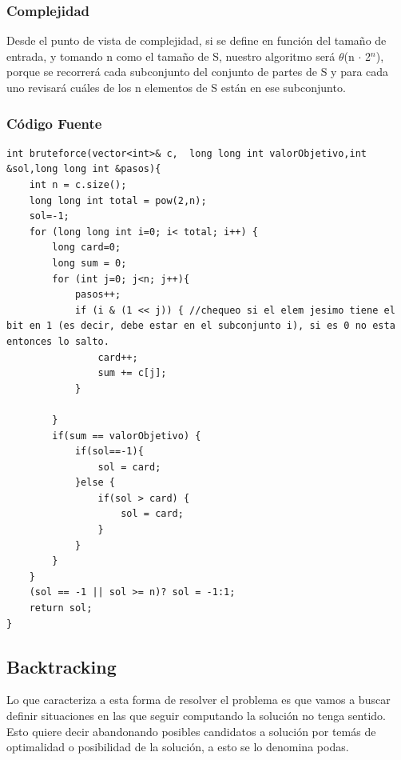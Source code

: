 \documentclass[7pt,a4paper]{article}
\begin{document}
\subsubsection{Complejidad}
Desde el punto de vista de complejidad, si se define en función del tamaño de entrada, y tomando n como el tamaño de S, nuestro algoritmo será $\theta$(n $\cdot$ 2$^{n}$), porque se recorrerá cada subconjunto del conjunto de partes de S y para cada uno revisará cuáles de los n elementos de S están en ese subconjunto.\\


\subsubsection{Código Fuente}
\begin{lstlisting}
int bruteforce(vector<int>& c,  long long int valorObjetivo,int &sol,long long int &pasos){
    int n = c.size();
    long long int total = pow(2,n);
    sol=-1;
    for (long long int i=0; i< total; i++) {
        long card=0;
        long sum = 0;
        for (int j=0; j<n; j++){
            pasos++;
            if (i & (1 << j)) { //chequeo si el elem jesimo tiene el bit en 1 (es decir, debe estar en el subconjunto i), si es 0 no esta entonces lo salto.
                card++;
                sum += c[j];
            }

        }
        if(sum == valorObjetivo) {
            if(sol==-1){
                sol = card;
            }else {
                if(sol > card) {
                    sol = card;
                }
            }
        }
    }
    (sol == -1 || sol >= n)? sol = -1:1;
    return sol;
}

\end{lstlisting}

\subsection{Backtracking}
Lo que caracteriza a esta forma de resolver el problema es que vamos a buscar definir situaciones en las que seguir computando la solución no tenga sentido. Esto quiere decir abandonando posibles candidatos a solución por temás de optimalidad o posibilidad de la solución, a esto se lo denomina podas. \\
\end{document}
